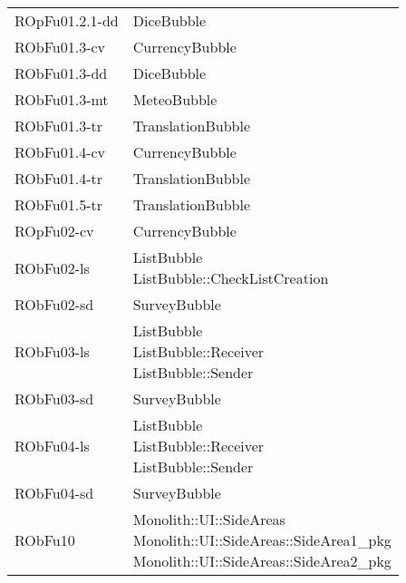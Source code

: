 \begin{center}
\begin{longtable}{|
*{1}{>{\centering\arraybackslash}m{2.5cm}|}
*{1}{>{\centering\arraybackslash}m{7.5cm}|}}
{\\}\\\hline
ROpFu01.2.1-dd & \makecell[l]{DiceBubble
\\}\\\hline
RObFu01.3-cv & \makecell[l]{CurrencyBubble
\\}\\\hline
RObFu01.3-dd & \makecell[l]{DiceBubble
\\}\\\hline
RObFu01.3-mt & \makecell[l]{MeteoBubble
\\}\\\hline
RObFu01.3-tr & \makecell[l]{TranslationBubble
\\}\\\hline
RObFu01.4-cv & \makecell[l]{CurrencyBubble
\\}\\\hline
RObFu01.4-tr & \makecell[l]{TranslationBubble
\\}\\\hline
RObFu01.5-tr & \makecell[l]{TranslationBubble
\\}\\\hline
ROpFu02-cv & \makecell[l]{CurrencyBubble
\\}\\\hline
RObFu02-ls & \makecell[l]{ListBubble
\\ListBubble::CheckListCreation
\\}\\\hline
RObFu02-sd & \makecell[l]{SurveyBubble
\\}\\\hline
RObFu03-ls & \makecell[l]{ListBubble
\\ListBubble::Receiver
\\ListBubble::Sender
\\}\\\hline
RObFu03-sd & \makecell[l]{SurveyBubble
\\}\\\hline
RObFu04-ls & \makecell[l]{ListBubble
\\ListBubble::Receiver
\\ListBubble::Sender
\\}\\\hline
RObFu04-sd & \makecell[l]{SurveyBubble
\\}\\\hline
RObFu10 & \makecell[l]{Monolith::UI::SideAreas
\\Monolith::UI::SideAreas::SideArea1\_pkg
\\Monolith::UI::SideAreas::SideArea2\_pkg
}
\end{longtable}
\end{center}
